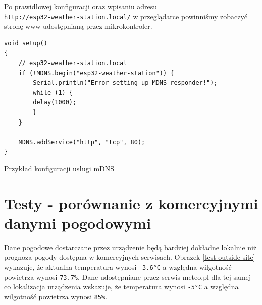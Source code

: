 \documentclass[12pt,a4paper]{article}
\begin{document}
Po prawidłowej konfiguracji oraz wpisaniu adresu \\\texttt{http://esp32-weather-station.local/} w przeglądarce powinniśmy zobaczyć stronę www udostępnianą przez
mikrokontroler.

\begin{code}[H]
\begin{verbatim}
void setup()
{
    // esp32-weather-station.local
    if (!MDNS.begin("esp32-weather-station")) {
        Serial.println("Error setting up MDNS responder!");
        while (1) {
        delay(1000);
        }
    }

    MDNS.addService("http", "tcp", 80);
}
\end{verbatim}
\caption{Przykład konfiguracji usługi mDNS}
\end{code}

\section[Testy - porównanie z komercyjnymi danymi pogodowymi]{Testy - porównanie z komercyjnymi\\
 danymi pogodowymi}


Dane pogodowe dostarczane przez urządzenie będą bardziej dokładne lokalnie niż prognoza pogody dostępna 
w komercyjnych serwisach. Obrazek \ref{test-outside-site} wykazuje, że aktualna temperatura wynosi 
\texttt{-3.6°C} a względna wilgotność powietrza wynosi \texttt{73.7\%}. 
Dane udostępniane przez serwis meteo.pl \cite{meteopl-nysa} dla tej samej co lokalizacja urządzenia
wskazuje, że temperatura wynosi 
\texttt{-5°C} a względna wilgotność powietrza wynosi \texttt{85\%}.
\end{document}
